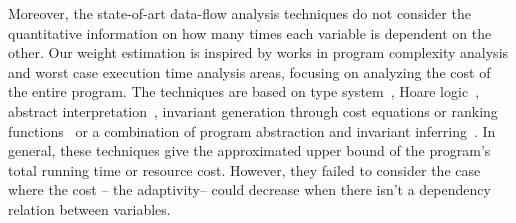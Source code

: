 %
%
%
Moreover, the state-of-art data-flow analysis techniques do not
consider the quantitative information on how many times each variable is dependent on the other. Our weight estimation is inspired by
 works in program complexity analysis and worst case execution time analysis areas, focusing on analyzing the cost of the entire program. 
The techniques are based on
type system~\cite{CicekBG0H17, RajaniG0021}, Hoare logic~\cite{CarbonneauxHS15}, abstract interpretation~\cite{GustafssonEL05, HumenbergerJK18},
invariant generation through cost equations or ranking functions~\cite{BrockschmidtEFFG16,AlbertAGP08,AliasDFG10,Flores-MontoyaH14}
or a combination of program abstraction and invariant inferring~\cite{GulwaniZ10, SinnZV17,GulwaniJK09}.
In general, these techniques give the approximated upper bound of the program's total running time or resource cost.
However, they failed to consider the case where the cost -- the adaptivity-- could decrease when there isn't a dependency relation between variables.
